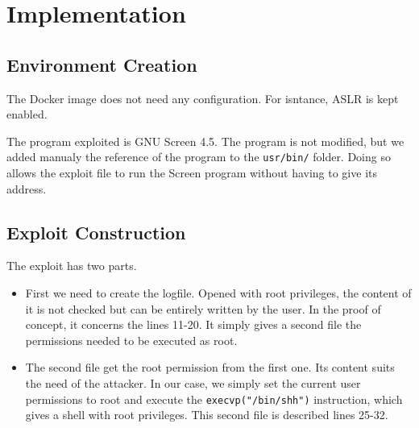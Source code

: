\section{Implementation}
\subsection{Environment Creation}
The Docker image does not need any configuration. For isntance, ASLR is kept enabled.

The program exploited is GNU Screen 4.5. The program is not modified, but we added manualy the reference of the program to the {\tt usr/bin/} folder. Doing so allows the exploit file to run the Screen program without having to give its address.

\subsection{Exploit Construction}
The exploit has two parts.

\begin{itemize}
\item First we need to create the logfile. Opened with root privileges, the content of it is not checked but can be entirely written by the user. In the proof of concept, it concerns the lines 11-20. It simply gives a second file the permissions needed to be executed as root.
\item The second file get the root permission from the first one. Its content suits the need of the attacker. In our case, we simply set the current user permissions to root and execute the {\tt execvp("/bin/shh")} instruction, which gives a shell with root privileges. This second file is described lines 25-32.
\end{itemize}

